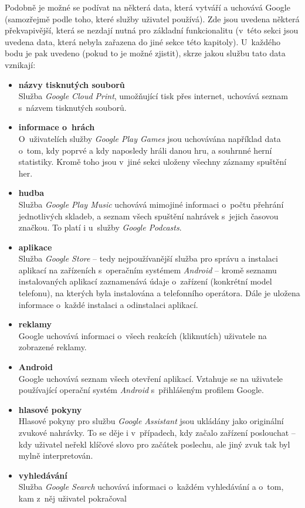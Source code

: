 Podobně je možné se podívat na některá data, která vytváří a uchovává Google (samozřejmě podle toho, které služby uživatel používá). Zde jsou uvedena některá překvapivější, která se nezdají nutná pro základní funkcionalitu (v~této sekci jsou uvedena data, která nebyla zařazena do jiné sekce této kapitoly).
U~každého bodu je pak uvedeno (pokud to je možné zjistit), skrze jakou službu tato data vznikají:

\begin{itemize}
	\item \textbf{názvy tisknutých souborů}\\
	Služba \textit{Google Cloud Print}, umožňující tisk přes internet, uchovává seznam s~názvem tisknutých souborů.

	\item \textbf{informace o~hrách}\\
	O~uživatelích služby \textit{Google Play Games} jsou uchovávána například data o~tom, kdy poprvé a kdy naposledy hráli danou hru, a souhrnné herní statistiky. Kromě toho jsou v~jiné sekci uloženy všechny záznamy spuštění her. 

	\item \textbf{hudba}\\
	Služba \textit{Google Play Music} uchovává mimojiné informaci o~počtu přehrání jednotlivých skladeb, a seznam všech spuštění nahrávek s~jejich časovou značkou. To platí i u~služby \textit{Google Podcasts}.

	\item \textbf{aplikace}\\
	Služba \textit{Google Store} -- tedy nejpoužívanější služba pro správu a instalaci aplikací na zařízeních s~operačním systémem \textit{Android} -- kromě seznamu instalovaných aplikací zaznamenává údaje o~zařízení (konkrétní model telefonu), na kterých byla instalována a telefonního operátora. Dále je uložena informace o~každé instalaci a odinstalaci aplikací.
	
	\item \textbf{reklamy}\\
	Google uchovává informaci o~všech reakcích (kliknutích) uživatele na zobrazené reklamy.

	\item \textbf{Android}\\
	Google uchovává seznam všech otevření aplikací. Vztahuje se na uživatele používající operační systém \textit{Android} s~přihlášeným profilem Google. 

	\item \textbf{hlasové pokyny}\\
	Hlasové pokyny pro službu \textit{Google Assistant} jsou ukládány jako originální zvukové nahrávky. To se děje i v~případech, kdy začalo zařízení poslouchat  -- kdy uživatel neřekl klíčové slovo pro začátek poslechu, ale jiný zvuk tak byl mylně interpretován. 

	\item \textbf{vyhledávání}\\
	Služba \textit{Google Search} uchovává informaci o~každém vyhledávání a o~tom, kam z~něj uživatel pokračoval
\end{itemize}

